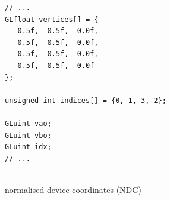 \documentclass[calcdimensions,landscape,letterpaper]{powersem}
\newcommand{\thecurrentheading}{}
\newcommand{\heading}[1]{\renewcommand{\thecurrentheading}{#1}}
\begin{document}
\begin{slide}
    \heading{Vertex and Index Data}
    \begin{center}
        \begin{minipage}[b]{.55\textwidth}
            \begin{verbatim}
// ...
GLfloat vertices[] = {
  -0.5f, -0.5f,  0.0f,
   0.5f, -0.5f,  0.0f,
  -0.5f,  0.5f,  0.0f,
   0.5f,  0.5f,  0.0f
};

unsigned int indices[] = {0, 1, 3, 2};

GLuint vao;
GLuint vbo;
GLuint idx;
// ...
            \end{verbatim}
        \end{minipage}
        \begin{minipage}[b]{.4\textwidth}
          \\
          normalised device coordinates (NDC)
        \end{minipage}
    \end{center}
\end{slide}
\end{document}
